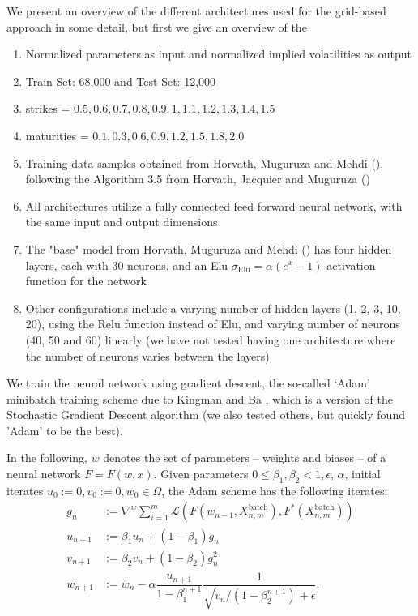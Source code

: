 \documentclass{article}
\theoremstyle{remark}
\begin{document}
We present an overview of the different architectures used for the grid-based approach in some detail, but first we give an overview of the  
\begin{enumerate}
\item Normalized parameters as input and normalized implied volatilities as output
\item Train Set: 68,000 and Test Set: 12,000
\item strikes = ${0.5, 0.6, 0.7, 0.8, 0.9, 1, 1.1, 1.2, 1.3, 1.4, 1.5}$
\item maturities = ${0.1, 0.3, 0.6, 0.9, 1.2, 1.5, 1.8, 2.0}$
\item Training data samples obtained from Horvath, Muguruza and Mehdi (\cite{HMM19}), following the Algorithm 3.5 from Horvath, Jacquier and Muguruza (\cite{HJM17})
\item All architectures utilize a fully connected feed forward neural network, with the same input and output dimensions
\item The "base" model from Horvath, Muguruza and Mehdi (\cite{HMM19}) has four hidden layers, each with 30 neurons, and an Elu $\sigma_{\mathrm{Elu}}=\alpha(e^x-1)$ activation
  function for the network
\item Other configurations include a varying number of hidden layers (1, 2, 3, 10, 20), using the Relu function instead of Elu, and varying number of neurons (40, 50 and 60) linearly (we have not tested having one architecture where the number of neurons varies between the layers)
\end{enumerate}

We train the neural network using gradient descent,
the so-called `Adam' minibatch training scheme due to Kingman and Ba \cite{KBAdam},
which is a version of the Stochastic Gradient Descent algorithm (we also tested others, but quickly found 'Adam' to be the best).

In the following, $w$ denotes the set of parameters --
weights and biases -- of a neural network $F = F(w,x)$.  Given parameters
$0 \leq \beta_{1}, \beta_{2} < 1, \epsilon$, $\alpha$, initial iterates
$u_{0} := 0, v_{0} := 0, w_{0}\in\Omega$, the Adam scheme has the following
iterates:
\begin{align*}
  g_{n} &  := \nabla^{w} \sum_{i = 1}^{m}
          \mathcal{L}\left(F(w_{n-1},X_{n,m}^{\text{batch}}),F^*(X_{n,m}^{\text{batch}})\right)\\ 
  u_{n+1} & := \beta_{1} u_{n} + (1 - \beta_{1})g_{n} \\
  v_{n+1} & := \beta_{2} v_{n} + (1 - \beta_{2}) g_{n}^{2} \\
  w_{n+1} & := w_{n} - \alpha \dfrac{u_{n+1}}{1 - \beta_{1}^{n+1}} \dfrac{1}{\sqrt{v_{n} / (1 - \beta_{2}^{n+1})} + \epsilon}.
\end{align*}
\end{document}
